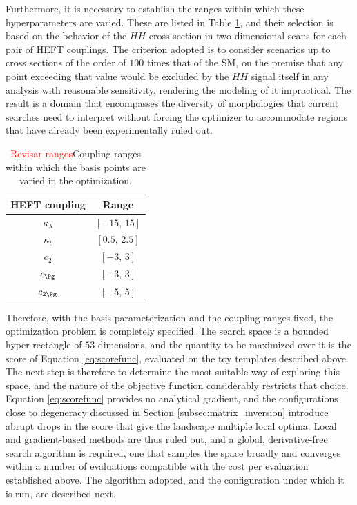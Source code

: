 Furthermore, it is necessary to establish the ranges within which these hyperparameters are varied. These are listed in Table \ref{tab:ranges}, and their selection is based on the behavior of the $HH$ cross section in two-dimensional scans for each pair of HEFT couplings. The criterion adopted is to consider scenarios up to cross sections of the order of $100$ times that of the SM, on the premise that any point exceeding that value would be excluded by the $HH$ signal itself in any analysis with reasonable sensitivity, rendering the modeling of it impractical. The result is a domain that encompasses the diversity of morphologies that current searches need to interpret without forcing the optimizer to accommodate regions that have already been experimentally ruled out.
%
\begin{table}
    \centering
    \begin{tabular}{cc}
        \toprule
        HEFT coupling & Range \\
        \midrule
        $\kappa_{\lambda}$ & $[-15,\,15]$ \\
        $\kappa_{t}$       & $[0.5,\,2.5]$ \\
        $c_2$              & $[-3,\,3]$ \\
        $c_{\Pg}$          & $[-3,\,3]$ \\
        $c_{2\Pg}$         & $[-5,\,5]$ \\
        \bottomrule
    \end{tabular}
    \caption{\textcolor{red}{Revisar rangos}Coupling ranges within which the basis points are varied in the optimization.}
    \label{tab:ranges}
\end{table}

Therefore, with the basis parameterization and the coupling ranges fixed, the optimization problem is completely specified. The search space is a bounded hyper-rectangle of $53$ dimensions, and the quantity to be maximized over it is the score of Equation \ref{eq:scorefunc}, evaluated on the toy templates described above. The next step is therefore to determine the most suitable way of exploring this space, and the nature of the objective function considerably restricts that choice. Equation \ref{eq:scorefunc} provides no analytical gradient, and the configurations close to degeneracy discussed in Section \ref{subsec:matrix_inversion} introduce abrupt drops in the score that give the landscape multiple local optima. Local and gradient-based methods are thus ruled out, and a global, derivative-free search algorithm is required, one that samples the space broadly and converges within a number of evaluations compatible with the cost per evaluation established above. The algorithm adopted, and the configuration under which it is run, are described next.



